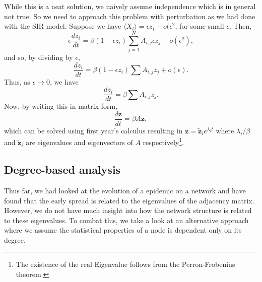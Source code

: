 \documentclass[
]{article}
\theoremstyle{definition}
\begin{document}
While this is a neat solution, we naively assume independence which is
in general not true. So we need to approach this problem with
perturbation as we had done with the SIR model. Suppose we have
\(\langle X_i \rangle = \epsilon z_i + o(\epsilon^2\), for some small
\(\epsilon\). Then,
\[\epsilon \frac{dz_i}{dt} = \beta(1 - \epsilon z_i) 
  \sum_{j = 1}^N A_{i, j}\epsilon z_j + o(\epsilon^2),\] and so, by
dividing by \(\epsilon\),
\[\frac{dz_i}{dt} = \beta(1 - \epsilon z_i) \sum A_{i, j} z_j + o(\epsilon).\]
Thus, as \(\epsilon \to 0\), we have
\[\frac{dz_i}{dt} = \beta \sum A_{i, j} z_j.\] Now, by writing this in
matrix form, \[\frac{d\mathbf{z}}{dt} = \beta A \mathbf{z},\] which can
be solved using first year's calculus resulting in
\(\mathbf{z} = \tilde{\mathbf{z}}_i e^{\lambda_i t}\) where
\(\lambda_i / \beta\) and \(\tilde{\mathbf{z}}_i\) are eigenvalues and
eigenvectors of \(A\)
respectively\footnote{The existence of the real Eigenvalue follows from the 
Perron-Frobenius theorem.}.

\hypertarget{degree-based-analysis}{%
\subsection{Degree-based analysis}\label{degree-based-analysis}}

Thus far, we had looked at the evolution of a epidemic on a network and
have found that the early spread is related to the eigenvalues of the
adjacency matrix. However, we do not have much insight into how the
network structure is related to these eigenvalues. To combat this, we
take a look at an alternative approach where we assume the statistical
properties of a node is dependent only on its degree.
\end{document}
